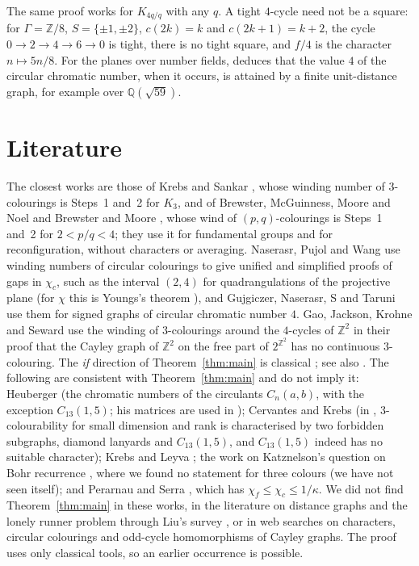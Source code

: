 \documentclass[11pt,a4paper]{amsart}
\theoremstyle{definition}
\newcommand{\Q}{\mathbb{Q}}
\newcommand{\Z}{\mathbb{Z}}
\begin{document}
The same proof works for $K_{4q/q}$ with any $q$. A tight $4$-cycle need not be a square: for $\Gamma=\Z/8$,
$S=\{\pm1,\pm2\}$, $c(2k)=k$ and $c(2k+1)=k+2$, the cycle $0\to2\to4\to6\to0$ is tight, there is no tight square, and
$f/4$ is the character $n\mapsto5n/8$. For the planes over number fields, \cite{TCol} deduces that the value $4$ of the
circular chromatic number, when it occurs, is attained by a finite unit-distance graph, for example over $\Q(\sqrt{59})$.

\section{Literature}\label{sec:lit}

The closest works are those of Krebs and Sankar \cite{KS}, whose winding number of $3$-colourings is Steps~1 and~2
for $K_3$, and of Brewster, McGuinness, Moore and Noel \cite{BMMN} and Brewster and Moore \cite{BM}, whose wind of
$(p,q)$-colourings is Steps~1 and~2 for $2<p/q<4$; they use it for fundamental groups and for reconfiguration,
without characters or averaging. Naserasr, Pujol and Wang \cite{NPW} use winding numbers of circular colourings to
give unified and simplified proofs of gaps in $\chi_c$, such as the interval $(2,4)$ for quadrangulations of the
projective plane (for $\chi$ this is Youngs's theorem \cite{Youngs}), and Gujgiczer, Naserasr, S and Taruni
\cite{GNST} use them for signed graphs of circular chromatic number $4$. Gao, Jackson, Krohne and Seward \cite{GJKS}
use the winding of $3$-colourings around the $4$-cycles of $\Z^2$ in their proof that the Cayley graph of $\Z^2$ on
the free part of $2^{\Z^2}$ has no continuous $3$-colouring. The \emph{if}
direction of Theorem~\ref{thm:main} is classical \cite{Liu,Alon}; see also \cite[proof of Theorem~2.3]{GKM}. The following are consistent with Theorem~\ref{thm:main} and do not imply it:
Heuberger \cite{Heuberger} (the chromatic numbers of the circulants $C_n(a,b)$, with the exception $C_{13}(1,5)$;
his matrices are used in \cite{CK1,KL}); Cervantes and Krebs \cite{CK1,CK2,CK3} (in \cite{CK3}, $3$-colourability for small dimension and rank is
characterised by two forbidden subgraphs, diamond lanyards and $C_{13}(1,5)$, and $C_{13}(1,5)$ indeed has no
suitable character); Krebs and Leyva \cite{KL}; the work on Katznelson's question on Bohr recurrence
\cite{Griesmer,HKM,LWYZ,BG}, where we found no statement for three colours (we have not seen \cite{Katznelson}
itself); and Perarnau and Serra \cite[\S3.5]{PS}, which has $\chi_f\le\chi_c\le1/\kappa$. We did
not find Theorem~\ref{thm:main} in these works, in the literature on distance graphs and the lonely runner problem
through Liu's survey \cite{Liu}, or in web searches on characters, circular colourings and odd-cycle
homomorphisms of Cayley graphs. The proof uses only classical tools, so an earlier occurrence is possible.
\end{document}
